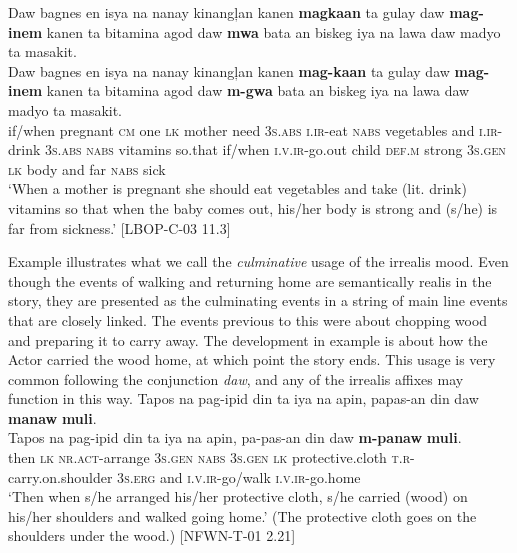 \ea
\label{bkm:Ref392932169}
Daw  bagnes  en  isya  na  nanay  kinangļan  kanen  \textbf{magkaan} ta  gulay  daw  \textbf{mag-inem}  kanen  ta  bitamina  agod  daw \textbf{mwa}  bata  an  biskeg  iya  na  lawa  daw  madyo  ta masakit. \\\smallskip
 \gll Daw  bagnes  en  isya  na  nanay  kinangļan  kanen  \textbf{mag-kaan} ta  gulay  daw  \textbf{mag-inem}  kanen  ta  bitamina  agod  daw \textbf{m-gwa}  bata  an  biskeg  iya  na  lawa  daw  madyo  ta masakit. \\
if/when  pregnant  \textsc{cm}  one  \textsc{lk}  mother  need  3\textsc{s.abs}  \textsc{i.ir}-eat
\textsc{nabs} vegetables  and  \textsc{i.ir}-drink  3\textsc{s.abs}  \textsc{nabs}  vitamins  so.that  if/when \textsc{i.v.ir}-go.out  child  \textsc{def.m}  strong  3\textsc{s.gen}  \textsc{lk}  body  and  far  \textsc{nabs} sick \\
\glt `When a mother is pregnant she should eat vegetables and take (lit. drink) vitamins so that when the baby comes out, his/her body is strong and (s/he) is far from sickness.’ [LBOP-C-03 11.3]
\z

Example  illustrates what we call the \textit{culminative} usage of the irrealis mood. Even though the events of walking and returning home are semantically realis in the story, they are presented as the culminating events in a string of main line events that are closely linked. The events previous to this were about chopping wood and preparing it to carry away. The development in example  is about how the Actor carried the wood home, at which point the story ends. This usage is very common following the conjunction \textit{daw}, and any of the irrealis affixes may function in this way.
\ea
\label{bkm:Ref396719550}
Tapos  na  pag-ipid  din  ta  iya  na  apin, papas-an  din  daw  \textbf{manaw}  \textbf{muli}. \\\smallskip
 \gll Tapos  na  pag-ipid  din  ta  iya\footnotemark{}  na  apin, pa-pas-an  din  daw  \textbf{m-panaw}  \textbf{muli}. \\
then  \textsc{lk}  \textsc{nr.act}-arrange  3\textsc{s.gen}  \textsc{nabs}  3\textsc{s.gen}  \textsc{lk} protective.cloth
\textsc{t.r}-carry.on.shoulder  3\textsc{s.erg}  and  \textsc{i.v.ir}-go/walk  \textsc{i.v.ir}-go.home \\
\glt `Then when s/he arranged his/her protective cloth, s/he carried (wood) on his/her shoulders and walked going home.’ (The protective cloth goes on the shoulders under the wood.) [NFWN-T-01 2.21]
\z

